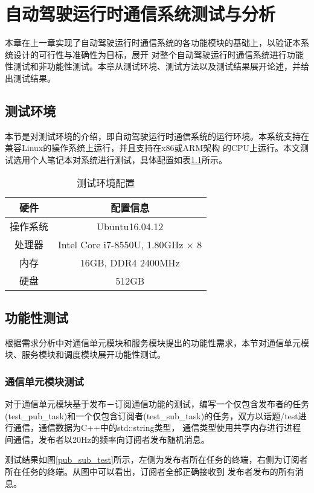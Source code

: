 \chapter{自动驾驶运行时通信系统测试与分析}
本章在上一章实现了自动驾驶运行时通信系统的各功能模块的基础上，以验证本系统设计的可行性与准确性为目标，展开
对整个自动驾驶运行时通信系统进行功能性测试和非功能性测试。本章从测试环境、测试方法以及测试结果展开论述，并给出测试结果。

\section{测试环境}
本节是对测试环境的介绍，即自动驾驶运行时通信系统的运行环境。本系统支持在兼容Linux的操作系统上运行，并且支持在x86或ARM架构
的CPU上运行。本文测试选用个人笔记本对系统进行测试，具体配置如表\ref{test_env}所示。
\begin{table}[htb]
  \centering\small
  \renewcommand\arraystretch{1.2}
  \caption{测试环境配置}
  \label{test_env}
  \begin{tabular}{cc}
    \toprule
    硬件 & 配置信息 \\
    \midrule
    操作系统 & Ubuntu16.04.12\\
    处理器 & Intel Core i7-8550U, 1.80GHz $\times$ 8\\
    内存 & 16GB, DDR4 2400MHz\\
    硬盘 & 512GB\\
    \bottomrule
  \end{tabular}
\end{table}
    
\section{功能性测试}
根据需求分析中对通信单元模块和服务模块提出的功能性需求，本节对通信单元模块、服务模块和调度模块展开功能性测试。
\subsection{通信单元模块测试}
对于通信单元模块基于发布－订阅通信功能的测试，编写一个仅包含发布者的任务(test\_pub\_task)和一个仅包含订阅者(test\_sub\_task)的任务，双方以话题/test进行通信，通信数据为C++中的std::string类型，
通信类型使用共享内存进行进程间通信，发布者以20Hz的频率向订阅者发布随机消息。

测试结果如图\ref{pub_sub_test}所示，左侧为发布者所在任务的终端，右侧为订阅者所在任务的终端。从图中可以看出，订阅者全部正确接收到
发布者发布的所有消息。

